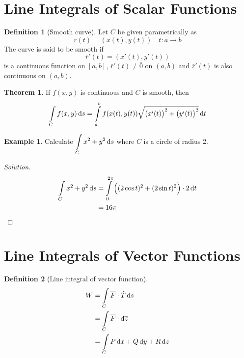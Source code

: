 \documentclass[fleqn, a4paper, 10pt]{article}
\theoremstyle{definition}
\newtheorem{example}{Example}
\newtheorem{definition}{Definition}
\theoremstyle{theorem}
\newtheorem{theorem}{Theorem}
\theoremstyle{remark}
\newenvironment{solution}
	{\begin{proof}[Solution]\let\qed\relax}
	{\end{proof}}
\begin{document}
\begin{multicols}{2}
\section{Line Integrals of Scalar Functions}

\begin{definition}[Smooth curve]
	Let $C$ be given parametrically as
	\begin{equation*}
		\overline{r} (t) = \left( x(t), y(t) \right) \quad t : a \to b
	\end{equation*}
	The curve is said to be smooth if 
	\begin{equation*}
		\overline{r}'(t) = \left( x'(t), y'(t) \right)
	\end{equation*}
	is a continuous function on $[a,b]$, $\overline{r}'(t) \neq \overline{0}$ on $(a,b)$ and $\overline{r}'(t)$ is also continuous on $(a,b)$.
\end{definition}

\begin{theorem}
	If $f(x,y)$ is continuous and $C$ is smooth, then
	\begin{equation*}
		\int\limits_{C} f(x,y) \dif s = \int\limits_{a}^{b} f(x(t), y(t)) \sqrt{\left( x'(t) \right)^2 + \left( y'(t) \right)^2} \dif t
	\end{equation*}
\end{theorem}

\begin{example}
	Calculate $\displaystyle \int\limits_{C} x^2 + y^2 \dif s$ where $C$ is a circle of radius 2.
\end{example}

\begin{solution}
	\begin{align*}
		\int\limits_{C} x^2 + y^2 \dif s &= \int\limits_{0}^{2 \pi} \left( (2 \cos t)^2 + (2 \sin t)^2 \right) \cdot 2 \dif t\\
		&= 16 \pi
	\end{align*}
\end{solution}

\section{Line Integrals of Vector Functions}

\begin{definition}[Line integral of vector function]
	\begin{align*}
		W &= \int\limits_{C} \overline{F} \cdot \hat{T} \dif s\\
		&= \int\limits_{C} \overline{F} \cdot \dif \overline{z}\\
		&= \int\limits_{C} P \dif x + Q \dif y + R \dif z
	\end{align*}
\end{definition}	


\end{multicols}
\end{document}
